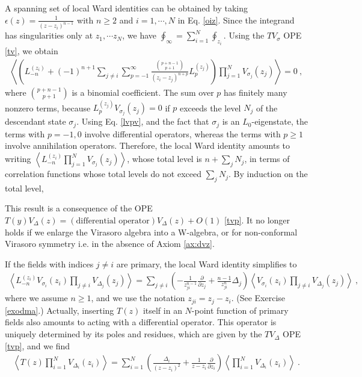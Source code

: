 \documentclass[12pt, a4paper, notitlepage, twoside]{report}
\numberwithin{equation}{section}
\theoremstyle{break}
\begin{document}
A spanning set of local Ward identities can be obtained by taking $\epsilon(z) = \frac{1}{(z-z_i)^{n-1}}$ with $n\geq 2$ and $i=1, \cdots , N$ in Eq. \eqref{oiz}. 
Since the integrand has singularities only at $z_1,\cdots z_N$, we have $\oint_\infty=\sum_{i=1}^N \oint_{z_i}$.
Using the 
$TV_\sigma$ OPE \eqref{tv}, we obtain
\begin{align}
 \left\langle \left( L_{-n}^{(z_i)} + (-1)^{n+1}\sum_{j\neq i}\sum_{p=-1}^\infty \frac{\binom{p+n-1}{p+1}}{(z_i-z_j)^{n+p}} L_p^{(z_j)}\right)  \prod_{j=1}^N V_{\sigma_j}(z_j) \right\rangle = 0\ ,
\label{lwi}
\end{align}
where $\binom{p+n-1}{p+1}$ is a binomial coefficient.
The sum over $p$ has finitely many nonzero terms, because $L_p^{(z_j)}V_{\sigma_j}(z_j)=0$ if $p$ exceeds the level $N_j$ of the descendant state $\sigma_j$. 
Using Eq. \eqref{lvpv}, and the fact that $\sigma_j$ is an $L_0$-eigenstate, the terms with $p=-1,0$ involve differential operators, whereas the terms with $p\geq 1$ involve annihilation operators. 
Therefore, the local Ward identity amounts to writing $\left\langle  L_{-n}^{(z_i)} \prod_{j=1}^N V_{\sigma_j}(z_j) \right\rangle$, whose total level is $n+\sum_j N_j$, in terms of correlation functions whose total levels do not exceed $\sum_jN_j$. By induction on the total level,
\begin{center}
\end{center}
This result is a consequence of the OPE $T(y)V_\Delta(z)=(\text{differential operator})V_\Delta(z) +O(1) $ \eqref{tvp}. It no longer holds if we enlarge the Virasoro algebra into a W-algebra, or for non-conformal Virasoro symmetry i.e. in the absence of Axiom \ref{ax:dvz}.

If the fields with indices $j\neq i$ are primary, the local Ward identity simplifies to
\begin{align}
 \boxed{\left\langle L_{-n}^{(z_i)}V_{\sigma_i}(z_i)\prod_{j\neq i} V_{\Delta_j}(z_j) \right\rangle =
\sum_{j\neq i} \left(-\frac{1}{z_{ji}^{n-1}} {\frac{\partial}{\partial z_j}}  + \frac{n-1}{z_{ji}^n} \Delta_j\right)
\left\langle V_{\sigma_i}(z_i)\prod_{j\neq i} V_{\Delta_j}(z_j) \right\rangle} \ ,
\label{lmn}
\end{align}
where we assume $n\geq 1$, and we use the notation $z_{ji}=z_j-z_i$. (See Exercise \ref{exodma}.) Actually, inserting $T(z)$ itself in an $N$-point function of primary fields also amounts to acting with a differential operator. This operator is uniquely determined by its poles and residues, which are given by the $TV_\Delta$ OPE \eqref{tvp}, and we find
\begin{align}
 \boxed{\left\langle T(z) \prod_{i=1}^N V_{\Delta_i}(z_i)\right\rangle = \sum_{i=1}^N \left(\frac{\Delta_i}{(z-z_i)^2} + \frac{1}{z-z_i}{\frac{\partial}{\partial z_i}}\right)\left\langle  \prod_{i=1}^N V_{\Delta_i}(z_i)\right\rangle }\ .
\label{dtz}
\end{align}
\end{document}
